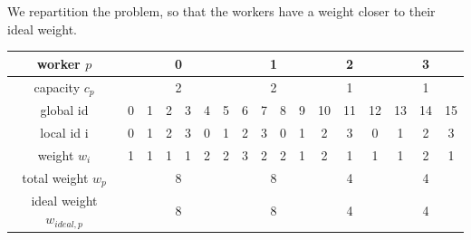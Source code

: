 We repartition the problem, so that the workers have a weight closer to their ideal weight.

\begin{table}[H]
	\begin{center}
		\begin{tabular}{ | c | c | c | c | c | c | c | c | c | c | c | c | c | c | c | c | c | } 
			\hline
			worker \(p\) & \multicolumn{6}{c|}{\cellcolor{vs_lightgreen}0} & \multicolumn{4}{c|}{\cellcolor{vs_lightblue}1} & \multicolumn{3}{c|}{\cellcolor{vs_lightred}2} & \multicolumn{3}{c|}{\cellcolor{vs_lightplum}3}  \\
			\hline
			capacity \(c_p\) & \multicolumn{6}{c|}{\cellcolor{vs_lightgreen}2} & \multicolumn{4}{c|}{\cellcolor{vs_lightblue}2} & \multicolumn{3}{c|}{\cellcolor{vs_lightred}1} & \multicolumn{3}{c|}{\cellcolor{vs_lightplum}1}  \\
			\hline
			global id & \cellcolor{vs_lightgreen}0 & \cellcolor{vs_lightgreen}1 & \cellcolor{vs_lightgreen}2 & \cellcolor{vs_lightgreen}3 & \cellcolor{vs_lightgreen}4 & \cellcolor{vs_lightgreen}5 & \cellcolor{vs_lightblue}6 & \cellcolor{vs_lightblue}7 & \cellcolor{vs_lightblue}8 & \cellcolor{vs_lightblue}9 & \cellcolor{vs_lightred}10 & \cellcolor{vs_lightred}11 & \cellcolor{vs_lightred}12 & \cellcolor{vs_lightplum}13 & \cellcolor{vs_lightplum}14 & \cellcolor{vs_lightplum}15 \\ 
			\hline
			local id i & \cellcolor{vs_lightgreen}0 & \cellcolor{vs_lightgreen}1 & \cellcolor{vs_lightgreen}2 & \cellcolor{vs_lightgreen}3 & \cellcolor{vs_lightgreen}0 & \cellcolor{vs_lightgreen}1 & \cellcolor{vs_lightblue}2 & \cellcolor{vs_lightblue}3 & \cellcolor{vs_lightblue}0 & \cellcolor{vs_lightblue}1 & \cellcolor{vs_lightred}2 & \cellcolor{vs_lightred}3 & \cellcolor{vs_lightred}0 & \cellcolor{vs_lightplum}1 & \cellcolor{vs_lightplum}2 & \cellcolor{vs_lightplum}3 \\ 
			\hline
			weight \(w_i\) & \cellcolor{vs_lightgreen}1 & \cellcolor{vs_lightgreen}1 & \cellcolor{vs_lightgreen}1 & \cellcolor{vs_lightgreen}1 & \cellcolor{vs_lightgreen}2 & \cellcolor{vs_lightgreen}2 & \cellcolor{vs_lightblue}3 & \cellcolor{vs_lightblue}2 & \cellcolor{vs_lightblue}2 & \cellcolor{vs_lightblue}1 & \cellcolor{vs_lightred}2 & \cellcolor{vs_lightred}1 & \cellcolor{vs_lightred}1 & \cellcolor{vs_lightplum}1 & \cellcolor{vs_lightplum}2 & \cellcolor{vs_lightplum}1 \\ 
			\hline
			total weight \(w_p\) & \multicolumn{6}{c|}{\cellcolor{vs_lightgreen}8} & \multicolumn{4}{c|}{\cellcolor{vs_lightblue}8} & \multicolumn{3}{c|}{\cellcolor{vs_lightred}4} & \multicolumn{3}{c|}{\cellcolor{vs_lightplum}4} \\ 
			\hline
			ideal weight \(w_{ideal,p}\) & \multicolumn{6}{c|}{\cellcolor{vs_lightgreen}8} & \multicolumn{4}{c|}{\cellcolor{vs_lightblue}8} & \multicolumn{3}{c|}{\cellcolor{vs_lightred}4} & \multicolumn{3}{c|}{\cellcolor{vs_lightplum}4} \\ 
			\hline
		\end{tabular}
	

\end{center}
\end{table}
